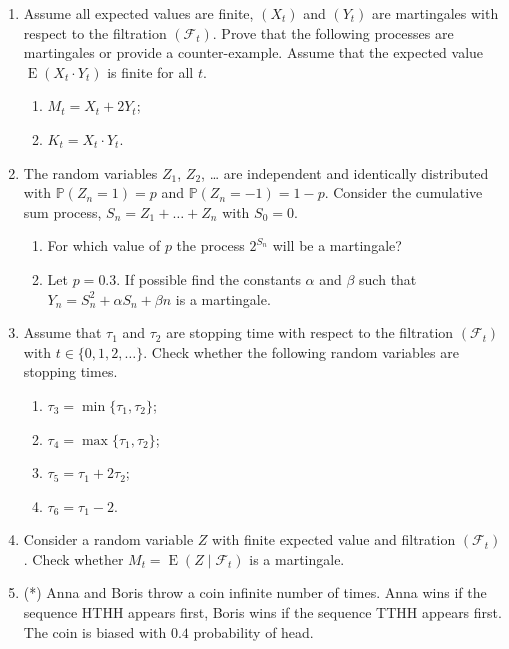 \documentclass[12pt]{article}
\DeclareMathOperator{\E}{E}
\def \cF{\mathcal{F}}
\def \P{\mathbb{P}}
\begin{document}
\begin{enumerate}


\item Assume all expected values are finite, $(X_t)$ and $(Y_t)$ are martingales with respect to the filtration $(\cF_t)$.
Prove that the following processes are martingales or provide a counter-example. 
Assume that the expected value $\E(X_t \cdot Y_t)$ is finite for all $t$. 

\begin{enumerate}
  \item $M_t = X_t + 2Y_t$;
  \item $K_t = X_t \cdot Y_t$.
\end{enumerate}

\item The random variables $Z_1$, $Z_2$, \ldots{}  are independent and identically distributed with 
$\P(Z_n = 1) = p$ and $\P(Z_n = -1) = 1-p$. Consider the cumulative sum process, $S_n = Z_1 + \ldots + Z_n$ with $S_0=0$.

\begin{enumerate}
  \item For which value of $p$ the process $2^{S_n}$ will be a martingale?
  \item Let $p=0.3$. 
  If possible find the constants $\alpha$ and $\beta$ such that $Y_n = S_n^2 + \alpha S_n + \beta n$ is a martingale.
\end{enumerate}

\item Assume that $\tau_1$ and $\tau_2$ are stopping time with respect to the filtration $(\cF_t)$ with $t \in \{0, 1, 2, \ldots\}$.
Check whether the following random variables are stopping times. 

\begin{enumerate}
  \item $\tau_3 = \min\{\tau_1, \tau_2\}$;
  \item $\tau_4 = \max\{\tau_1, \tau_2\}$;
  \item $\tau_5 = \tau_1 + 2\tau_2$;
  \item $\tau_6 = \tau_1 - 2$.
\end{enumerate}


\item Consider a random variable $Z$ with finite expected value and filtration $(\cF_t)$. 
Check whether $M_t = \E(Z \mid \cF_t)$ is a martingale.


\item (*) Anna and Boris throw a coin infinite number of times.
Anna wins if the sequence HTHH appears first, Boris wins if the sequence TTHH appears first. 
The coin is biased with $0.4$ probability of head.


\end{enumerate}
\end{document}
